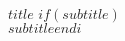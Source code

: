 \thispagestyle{firststyle}
~\vspace{1cm}
\begin{center}
\textbf{\Huge $title$}
$if(subtitle)$\\\textbf{\Large $subtitle$}$endi$
\end{center}